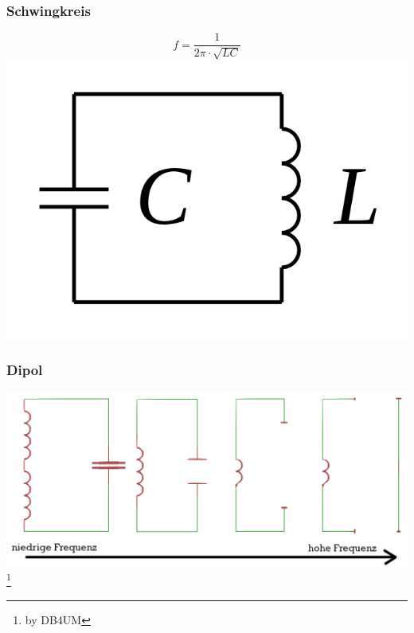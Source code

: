 \begin{frame}
    \frametitle{Schwingkreis}
    \begin{center} \huge
    $$f = \frac{1}{2  \pi \cdot \sqrt{LC}}$$
        \includegraphics[width=.8\textwidth]{e11/Schwingkreis.png}
	\end{center}
\end{frame}


\begin{frame}
    \frametitle{Dipol}
    \begin{center}
        \includegraphics[width=1\textwidth]{e11/dipol_entstehung.png}
        \footnote{\tiny by DB4UM}
	\end{center}
\end{frame}


